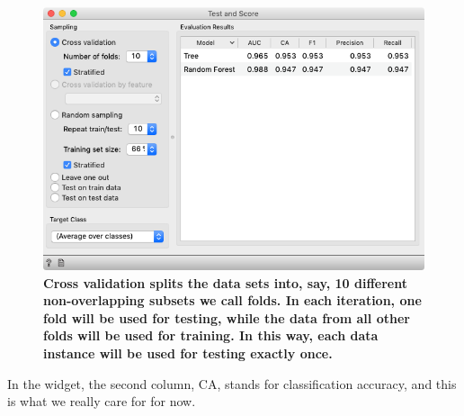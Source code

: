 \begin{figure}[h]
    \includegraphics[scale=0.4]{test_and_score.png}
    \caption{\textbf{\textsf{Cross validation splits the data sets into, say, 10 different non-overlapping subsets we call folds. In each iteration, one fold will be used for testing, while the data from all other folds will be used for training. In this way, each data instance will be used for testing exactly once.}}}
\end{figure}

In the  widget, the second column, CA, stands for classification accuracy, and this is what we really care for for now.